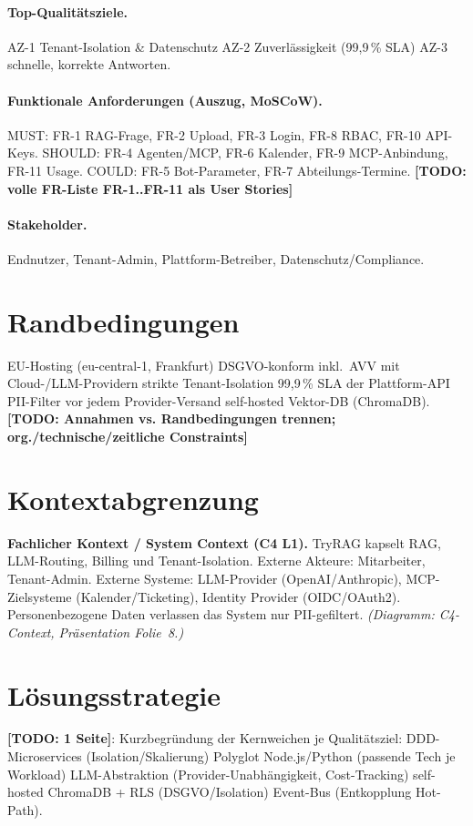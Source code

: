\documentclass[11pt,a4paper]{article}
\newcommand{\todo}[1]{\textcolor{bad}{\textbf{[TODO: #1]}}}
\begin{document}
\paragraph{Top-Qualit\"atsziele.} AZ-1 Tenant-Isolation \& Datenschutz \textbullet{}
AZ-2 Zuverl\"assigkeit (99,9\,\% SLA) \textbullet{} AZ-3 schnelle, korrekte Antworten.

\paragraph{Funktionale Anforderungen (Auszug, MoSCoW).}
MUST: FR-1 RAG-Frage, FR-2 Upload, FR-3 Login, FR-8 RBAC, FR-10 API-Keys.
SHOULD: FR-4 Agenten/MCP, FR-6 Kalender, FR-9 MCP-Anbindung, FR-11 Usage.
COULD: FR-5 Bot-Parameter, FR-7 Abteilungs-Termine. \todo{volle FR-Liste FR-1..FR-11 als User Stories}

\paragraph{Stakeholder.} Endnutzer, Tenant-Admin, Plattform-Betreiber,
Datenschutz/Compliance.

\section{Randbedingungen }
EU-Hosting (eu-central-1, Frankfurt) \textbullet{} DSGVO-konform inkl.\ AVV mit
Cloud-/LLM-Providern \textbullet{} strikte Tenant-Isolation \textbullet{} 99,9\,\% SLA
der Plattform-API \textbullet{} PII-Filter vor jedem Provider-Versand \textbullet{}
self-hosted Vektor-DB (ChromaDB). \todo{Annahmen vs. Randbedingungen trennen; org./technische/zeitliche Constraints}

\section{Kontextabgrenzung }
\textbf{Fachlicher Kontext / System Context (C4 L1).} TryRAG kapselt RAG, LLM-Routing,
Billing und Tenant-Isolation. Externe Akteure: Mitarbeiter, Tenant-Admin. Externe
Systeme: LLM-Provider (OpenAI/Anthropic), MCP-Zielsysteme (Kalender/Ticketing),
Identity Provider (OIDC/OAuth2). Personenbezogene Daten verlassen das System nur
PII-gefiltert. \emph{(Diagramm: C4-Context, Pr\"asentation Folie~8.)}

\section{Lösungsstrategie }
\todo{1 Seite}: Kurzbegr\"undung der Kernweichen je Qualit\"atsziel:
DDD-Microservices (Isolation/Skalierung) \textbullet{} Polyglot Node.js/Python
(passende Tech je Workload) \textbullet{} LLM-Abstraktion (Provider-Unabh\"angigkeit,
Cost-Tracking) \textbullet{} self-hosted ChromaDB + RLS (DSGVO/Isolation) \textbullet{}
Event-Bus (Entkopplung Hot-Path).
\end{document}
